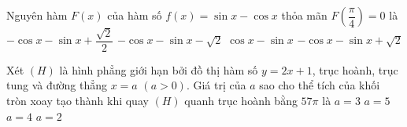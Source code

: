 \begin{ex}%
	Nguyên hàm $F(x)$ của hàm số $f(x)=\sin x-\cos x$ thỏa mãn $F\left(\dfrac{\pi}{4}\right)=0$ là
	\choice
	{$-\cos x-\sin x+\dfrac{\sqrt{2}}{2}$}
	{$-\cos x-\sin x-\sqrt{2}$}
	{$\cos x-\sin x$}
	{\True $-\cos x-\sin x+\sqrt{2}$}
\end{ex}
\begin{ex}%
	Xét $(H)$ là hình phẳng giới hạn bởi đồ thị hàm số $y=2x+1$, trục hoành, trục tung và đường thẳng $x=a$ $(a>0)$. Giá trị của $a$ sao cho thể tích của khối tròn xoay tạo thành khi quay $(H)$ quanh trục hoành bằng $57\pi$ là 
	\choice
	{\True $a=3$}
	{$a=5$}
	{$a=4$}
	{$a=2$}
\end{ex}

